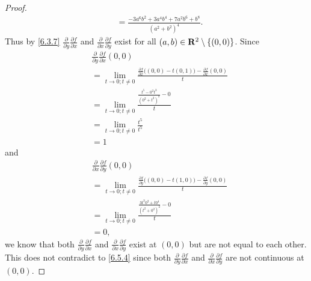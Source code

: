 \begin{proof}
\begin{align*}
     & = \frac{-3 a^6 b^2 + 3 a^4 b^4 + 7 a^2 b^6 + b^8}{(a^2 + b^2)^4}.
  \end{align*}
  Thus by \cref{6.3.7} \(\frac{\partial}{\partial y} \frac{\partial f}{\partial x}\) and \(\frac{\partial}{\partial x} \frac{\partial f}{\partial y}\) exist for all \((a, b) \in \mathbf{R}^2 \setminus \{(0, 0)\}\).
  Since
  \begin{align*}
     & \frac{\partial}{\partial y} \frac{\partial f}{\partial x}(0, 0)                                                                     \\
     & = \lim_{t \to 0 ; t \neq 0} \frac{\frac{\partial f}{\partial x}\big((0, 0) - t(0, 1)\big) - \frac{\partial f}{\partial x}(0, 0)}{t} \\
     & = \lim_{t \to 0 ; t \neq 0} \frac{\frac{t^5 - 0^2 t^3}{(0^2 + t^2)^2} - 0}{t}                                                       \\
     & = \lim_{t \to 0 ; t \neq 0} \frac{t^5}{t^5}                                                                                         \\
     & = 1
  \end{align*}
  and
  \begin{align*}
     & \frac{\partial}{\partial x} \frac{\partial f}{\partial y}(0, 0)                                                                     \\
     & = \lim_{t \to 0 ; t \neq 0} \frac{\frac{\partial f}{\partial y}\big((0, 0) - t(1, 0)\big) - \frac{\partial f}{\partial y}(0, 0)}{t} \\
     & = \lim_{t \to 0 ; t \neq 0} \frac{\frac{3 t^3 0^2 + t 0^4}{(t^2 + 0^2)^2} - 0}{t}                                                   \\
     & = 0,
  \end{align*}
  we know that both \(\frac{\partial}{\partial y} \frac{\partial f}{\partial x}\) and \(\frac{\partial}{\partial x} \frac{\partial f}{\partial y}\) exist at \((0, 0)\) but are not equal to each other.
  This does not contradict to \cref{6.5.4} since both \(\frac{\partial}{\partial y} \frac{\partial f}{\partial x}\) and \(\frac{\partial}{\partial x} \frac{\partial f}{\partial y}\) are not continuous at \((0, 0)\).
\end{proof}